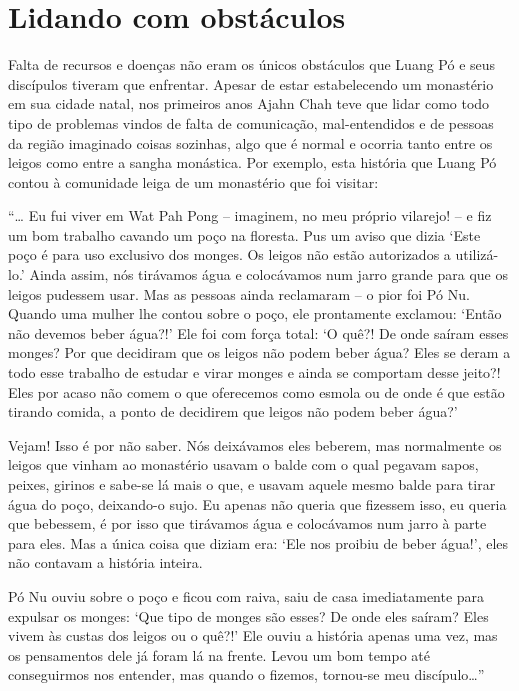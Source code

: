 \thistitleoffsettrue
\chapter{Lidando com obstáculos}

Falta de recursos e doenças não eram os únicos obstáculos que Luang Pó e
seus discípulos tiveram que enfrentar. Apesar de estar estabelecendo um
monastério em sua cidade natal, nos primeiros anos Ajahn Chah teve que
lidar como todo tipo de problemas vindos de falta de comunicação,
mal-entendidos e de pessoas da região imaginado coisas sozinhas, algo
que é normal e ocorria tanto entre os leigos como entre a sangha
monástica. Por exemplo, esta história que Luang Pó contou à comunidade
leiga de um monastério que foi visitar:

``\ldots{} Eu fui viver em Wat Pah Pong -- imaginem, no meu próprio
vilarejo! -- e fiz um bom trabalho cavando um poço na floresta. Pus um
aviso que dizia `Este poço é para uso exclusivo dos monges. Os leigos
não estão autorizados a utilizá-lo.' Ainda assim, nós tirávamos água e
colocávamos num jarro grande para que os leigos pudessem usar. Mas as
pessoas ainda reclamaram -- o pior foi Pó Nu. Quando uma mulher lhe
contou sobre o poço, ele prontamente exclamou: `Então não devemos beber
água?!' Ele foi com força total: `O quê?! De onde saíram esses monges?
Por que decidiram que os leigos não podem beber água? Eles se deram a
todo esse trabalho de estudar e virar monges e ainda se comportam desse
jeito?! Eles por acaso não comem o que oferecemos como esmola ou de onde
é que estão tirando comida, a ponto de decidirem que leigos não podem
beber água?'

Vejam! Isso é por não saber. Nós deixávamos eles beberem, mas
normalmente os leigos que vinham ao monastério usavam o balde com o qual
pegavam sapos, peixes, girinos e sabe-se lá mais o que, e usavam aquele
mesmo balde para tirar água do poço, deixando-o sujo. Eu apenas não
queria que fizessem isso, eu queria que bebessem, é por isso que
tirávamos água e colocávamos num jarro à parte para eles. Mas a única
coisa que diziam era: `Ele nos proibiu de beber água!', eles não
contavam a história inteira.

Pó Nu ouviu sobre o poço e ficou com raiva, saiu de casa imediatamente
para expulsar os monges: `Que tipo de monges são esses? De onde eles
saíram? Eles vivem às custas dos leigos ou o quê?!' Ele ouviu a história
apenas uma vez, mas os pensamentos dele já foram lá na frente. Levou um
bom tempo até conseguirmos nos entender, mas quando o fizemos, tornou-se
meu discípulo\ldots{}''

